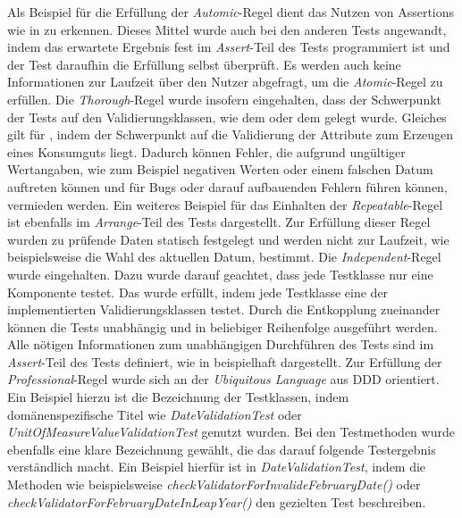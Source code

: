 Als Beispiel für die Erfüllung der \textit{Automic}-Regel dient das Nutzen von Assertions wie in \href{}{\code{}} zu erkennen.
Dieses Mittel wurde auch bei den anderen Tests angewandt, indem das erwartete Ergebnis fest im \textit{Assert}-Teil des Tests programmiert ist und der Test daraufhin die Erfüllung selbst überprüft.
Es werden auch keine Informationen zur Laufzeit über den Nutzer abgefragt, um die \textit{Atomic}-Regel zu erfüllen.
Die \textit{Thorough}-Regel wurde insofern eingehalten, dass der Schwerpunkt der Tests auf den Validierungsklassen, wie dem \href{}{\code{}} oder dem \href{}{\code{}} gelegt wurde.
Gleiches gilt für \href{}{\code{}}, indem der Schwerpunkt auf die Validierung der Attribute zum Erzeugen eines Konsumguts liegt.
Dadurch können Fehler, die aufgrund ungültiger Wertangaben, wie zum Beispiel negativen Werten oder einem falschen Datum auftreten können und für Bugs oder darauf aufbauenden Fehlern führen können, vermieden werden.
Ein weiteres Beispiel für das Einhalten der \textit{Repeatable}-Regel ist ebenfalls im \textit{Arrange}-Teil des Tests \href{}{\code{}} dargestellt.
Zur Erfüllung dieser Regel wurden zu prüfende Daten statisch festgelegt und werden nicht zur Laufzeit, wie beispielsweise die Wahl des aktuellen Datum, bestimmt.
Die \textit{Independent}-Regel wurde eingehalten. Dazu wurde darauf geachtet, dass jede Testklasse nur eine Komponente testet.
Das wurde erfüllt, indem jede Testklasse eine der implementierten Validierungsklassen testet.
Durch die Entkopplung zueinander können die Tests unabhängig und in beliebiger Reihenfolge ausgeführt werden.
Alle nötigen Informationen zum unabhängigen Durchführen des Tests sind im \textit{Assert}-Teil des Tests definiert, wie in \href{}{\code{}} beispielhaft dargestellt.
Zur Erfüllung der \textit{Professional}-Regel wurde sich an der \textit{Ubiquitous Language} aus \ac{DDD} orientiert. Ein Beispiel hierzu ist die Bezeichnung der Testklassen, indem domänenspezifische Titel wie \href{}{\code{}}\textit{DateValidationTest} oder \href{}{\code{}}\textit{UnitOfMeasureValueValidationTest} genutzt wurden.
Bei den Testmethoden wurde ebenfalls eine klare Bezeichnung gewählt, die das darauf folgende Testergebnis verständlich macht.
Ein Beispiel hierfür ist in \href{}{\code{}}\textit{DateValidationTest}, indem die Methoden wie beispielsweise \href{}{\code{}}\textit{ checkValidatorForInvalideFebruaryDate()} oder \href{}{\code{}}\textit{ checkValidatorForFebruaryDateInLeapYear()} den gezielten Test beschreiben.

